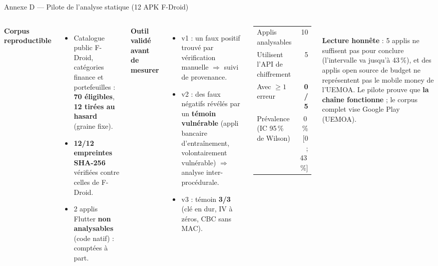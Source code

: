 \documentclass[aspectratio=169,10pt]{beamer}
\begin{document}
\begin{frame}{Annexe D --- Pilote de l'analyse statique (12 APK F-Droid)}
  \begin{columns}[T]
    \scriptsize
    \textbf{Corpus reproductible}
    \begin{itemize}
      \item Catalogue public F-Droid, catégories finance et portefeuilles : \textbf{70 éligibles}, \textbf{12 tirées au hasard} (graine fixe).
      \item \textbf{12/12 empreintes SHA-256} vérifiées contre celles de F-Droid.
      \item 2 applis Flutter \textbf{non analysables} (code natif) : comptées à part.
    \end{itemize}
    \textbf{Outil validé avant de mesurer}
    \begin{itemize}
      \item v1 : un \alert{faux positif} trouvé par vérification manuelle $\Rightarrow$ suivi de provenance.
      \item v2 : des \alert{faux négatifs} révélés par un \textbf{témoin vulnérable} (appli bancaire d'entraînement, volontairement vulnérable) $\Rightarrow$ analyse inter-procédurale.
      \item v3 : témoin \textbf{3/3} (clé en dur, IV à zéros, CBC sans MAC).
    \end{itemize}
    \scriptsize
    \begin{tabular}{lr}
      \toprule
      Applis analysables & 10 \\
      Utilisent l'API de chiffrement & 5 \\
      Avec $\geq 1$ erreur & \textbf{0 / 5} \\
      Prévalence (IC 95\,\% de Wilson) & 0\,\% [0 ; 43\,\%] \\
      \bottomrule
    \end{tabular}\\[0.4em]
    \textbf{Lecture honnête} : 5 applis ne suffisent pas pour conclure (l'intervalle va jusqu'à 43\,\%),
    et des applis open source de budget ne représentent pas le mobile money de l'UEMOA.
    Le pilote prouve que \textbf{la chaîne fonctionne} ; le corpus complet vise Google Play (UEMOA).
  \end{columns}
\end{frame}

\fi
\end{document}
